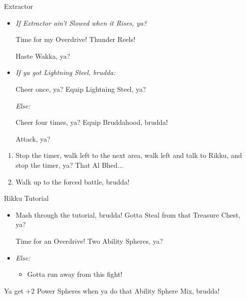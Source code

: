 \begin{battle}[4000]{Extractor}
\begin{itemize}
\tidusf Haste himself, ya?
\wakkaf If anyone's HP is less than 216, use a Hi-Potion, otherwise Attack, brudda!
\tidusf Attack that Extractor until you make it Slow, ya?
\item \textit{If Extractor ain't Slowed when it Rises, ya?}
\begin{itemize}
\wakkaf Time for my Overdrive! Thunder Reels!
\end{itemize}
\tidusf Haste Wakka, ya?
\item \textit{If ya got Lightning Steel, brudda:}
\begin{itemize}
\tidusf Cheer once, ya?
\tidusf Equip Lightning Steel, ya?
\end{itemize}
\textit{Else:}
\begin{itemize}
\tidusf Cheer four times, ya?
\tidusf Equip Bruddahood, brudda!
\end{itemize}
\tidusf Attack, ya?
\end{itemize}
\end{battle}
\begin{enumerate}[resume]
\item Stop the timer, walk left to the next area, walk left and talk to Rikku, and stop the timer, ya? That Al Bhed...
\item Walk up to the forced battle, brudda!
\end{enumerate}
\begin{battle}{Rikku Tutorial}
\begin{itemize}
\item Mash through the tutorial, brudda!
\rikkuf Gotta Steal from that Treasure Chest, ya?
\begin{itemize}
\rikkuf Time for an Overdrive! Two Ability Spheres, ya?
\end{itemize}
\item \textit{Else:}
\begin{itemize}
\rikkuf Time for an Overdrive! Two Potions or Hi-Potions, ya?
\rikkuf Defend, brudda!
\item Gotta run away from this fight!
\end{itemize}
\end{itemize}
Ya get +2 Power Spheres when ya do that Ability Sphere Mix, brudda!
\end{battle}
